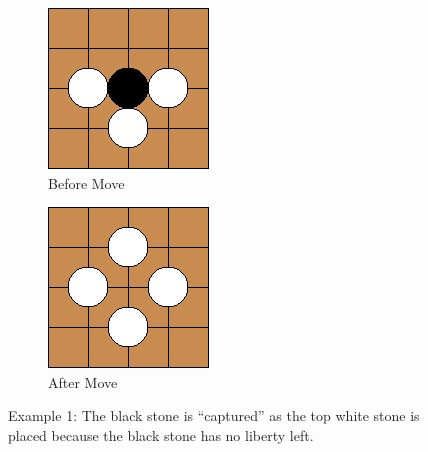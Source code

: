 \documentclass{l4proj}
\begin{document}
\begin{figure}[!ht]
\centering
\begin{subfigure}[b]{0.45\textwidth}
\includegraphics[width=\textwidth]{ex/Ex1-0.png}
\caption{Before Move}
\label{fig:ex1-0}
\end{subfigure}
\begin{subfigure}[b]{0.45\textwidth}
\includegraphics[width=\textwidth]{ex/Ex1-1.png}
\caption{After Move}
\label{fig:ex1-1}
\end{subfigure}
\caption{Example 1: The black stone is “captured” as the top white stone is placed because the black stone has no liberty left.}
\label{fig:ex1}
\end{figure}
\end{document}
